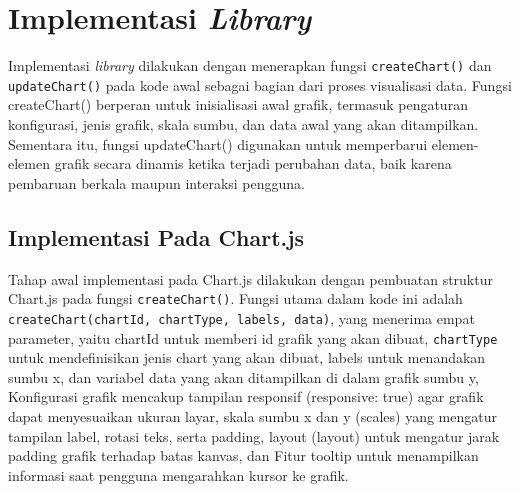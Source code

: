 \section{Implementasi \textit{Library}}
Implementasi \textit{library} dilakukan dengan menerapkan fungsi \texttt{createChart()} dan \texttt{updateChart()} pada kode awal sebagai bagian dari proses visualisasi data. Fungsi createChart() berperan untuk inisialisasi awal grafik, termasuk pengaturan konfigurasi, jenis grafik, skala sumbu, dan data awal yang akan ditampilkan. Sementara itu, fungsi updateChart() digunakan untuk memperbarui elemen-elemen grafik secara dinamis ketika terjadi perubahan data, baik karena pembaruan berkala maupun interaksi pengguna.
\subsection{Implementasi Pada Chart.js}
Tahap awal implementasi pada Chart.js dilakukan dengan pembuatan struktur Chart.js pada fungsi \texttt{createChart()}. Fungsi utama dalam kode ini adalah \texttt{createChart(chartId, chartType, labels, data)}, yang menerima empat parameter, yaitu chartId untuk memberi id grafik yang akan dibuat, \texttt{chartType} untuk mendefinisikan jenis chart yang akan dibuat, labels untuk menandakan sumbu x, dan variabel data yang akan ditampilkan di dalam grafik sumbu y,  Konfigurasi grafik mencakup tampilan responsif (responsive: true) agar grafik dapat menyesuaikan ukuran layar, skala sumbu x dan y (scales) yang mengatur tampilan label, rotasi teks, serta padding, layout (layout) untuk mengatur jarak padding grafik terhadap batas kanvas, dan Fitur tooltip untuk menampilkan informasi saat pengguna mengarahkan kursor ke grafik.
